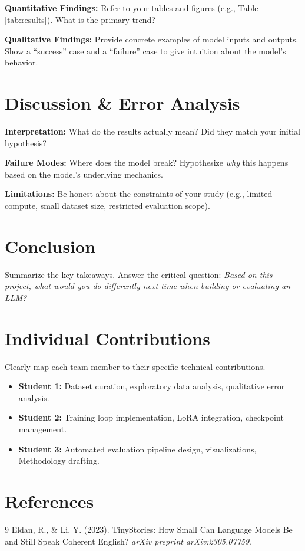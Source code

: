 \documentclass[11pt, twocolumn]{article}
\begin{document}
\textbf{Quantitative Findings:} Refer to your tables and figures (e.g., Table \ref{tab:results}). What is the primary trend?

\textbf{Qualitative Findings:} Provide concrete examples of model inputs and outputs. Show a ``success'' case and a ``failure'' case to give intuition about the model's behavior.

\section{Discussion \& Error Analysis}
\textbf{Interpretation:} What do the results actually mean? Did they match your initial hypothesis?

\textbf{Failure Modes:} Where does the model break? Hypothesize \textit{why} this happens based on the model's underlying mechanics.

\textbf{Limitations:} Be honest about the constraints of your study (e.g., limited compute, small dataset size, restricted evaluation scope).

\section{Conclusion}
Summarize the key takeaways. Answer the critical question: \textit{Based on this project, what would you do differently next time when building or evaluating an LLM?}

\section{Individual Contributions}
Clearly map each team member to their specific technical contributions.
\begin{itemize}
    \item \textbf{Student 1:} Dataset curation, exploratory data analysis, qualitative error analysis.
    \item \textbf{Student 2:} Training loop implementation, LoRA integration, checkpoint management.
    \item \textbf{Student 3:} Automated evaluation pipeline design, visualizations, Methodology drafting.
\end{itemize}

\section{References}
\begin{thebibliography}{9}
Eldan, R., \& Li, Y. (2023). TinyStories: How Small Can Language Models Be and Still Speak Coherent English? \textit{arXiv preprint arXiv:2305.07759}.
\end{thebibliography}
% 
\end{document}
